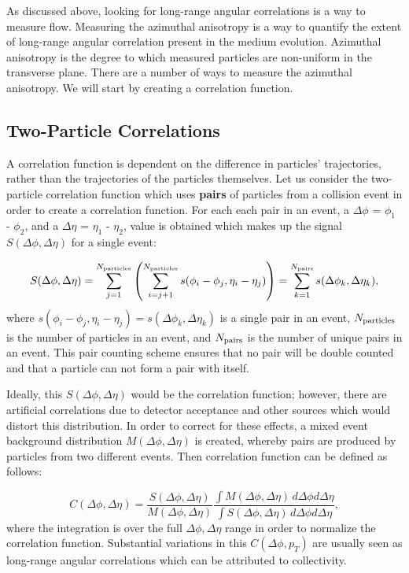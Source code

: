 As discussed above, looking for long-range angular correlations is a way to measure flow. Measuring the azimuthal anisotropy is a way to quantify the extent of long-range angular correlation present in the medium evolution. Azimuthal anisotropy is the degree to which measured particles are non-uniform in the transverse plane. There are a number of ways to measure the azimuthal anisotropy. We will start by creating a correlation function. 

\subsection{Two-Particle Correlations}

A correlation function is dependent on the difference in particles' trajectories, rather than the trajectories of the particles themselves. Let us consider the two-particle correlation function which uses \textbf{pairs} of particles from a collision event in order to create a correlation function. For each each pair in an event, a $\Delta\phi$ = $\phi_1$ - $\phi_2$, and a $\Delta\eta$ = $\eta_1$ - $\eta_2$, value is obtained which makes up the signal $S(\Delta\phi,\Delta\eta)$ for a single event: 

\begin{equation}
  S(\Delta\phi,\Delta\eta) = \sum_{j=1}^{N_{\rm particles}}\left(\sum_{i=j+1}^{N_{\rm particles}}s(\phi_i - \phi_j,\eta_i - \eta_j)\right)=\sum_{k=1}^{N_{\rm pairs}}s(\Delta\phi_k,\Delta\eta_k),
\end{equation}
where $s(\phi_i - \phi_j,\eta_i - \eta_j) = s(\Delta\phi_k,\Delta\eta_k)$ is a single pair in an event, $N_{\rm particles}$ is the number of particles in an event, and $N_{\rm pairs}$ is the number of unique pairs in an event. This pair counting scheme ensures that no pair will be double counted and that a particle can not form a pair with itself.

Ideally, this $S(\Delta\phi,\Delta\eta)$ would be the correlation function; however, there are artificial correlations due to detector acceptance and other sources which would distort this distribution. In order to correct for these effects, a mixed event background distribution $M(\Delta\phi,\Delta\eta)$ is created, whereby pairs are produced by particles from two different events. Then correlation function can be defined as follows:

\begin{equation}
  C(\Delta\phi,\Delta\eta) =
          \frac{S(\Delta\phi,\Delta\eta)}{M(\Delta\phi,\Delta\eta)} 
          \frac{\int M(\Delta\phi,\Delta\eta) \, d\Delta\phi d\Delta\eta}{\int S(\Delta\phi,\Delta\eta) \, d\Delta\phi d\Delta\eta},
  \label{eq:def_corr_function}
\end{equation}
where the integration is over the full $\Delta\phi,\Delta\eta$ range in order to normalize the correlation function. Substantial variations in this $C(\Delta\phi,p_T)$ are usually seen as long-range angular correlations which can be attributed to collectivity.

